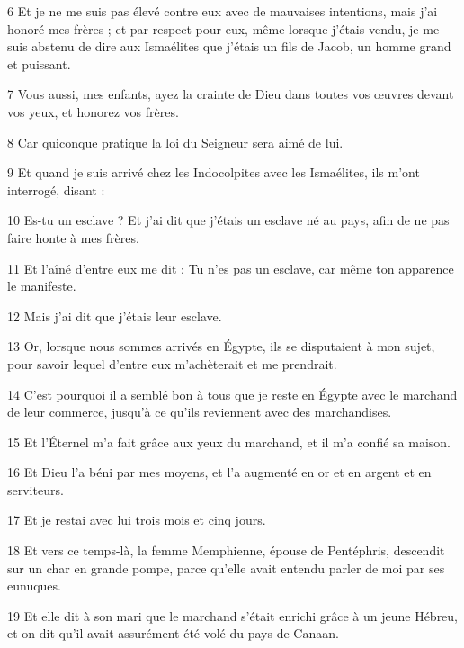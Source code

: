 \par 6 Et je ne me suis pas élevé contre eux avec de mauvaises intentions, mais j'ai honoré mes frères ; et par respect pour eux, même lorsque j'étais vendu, je me suis abstenu de dire aux Ismaélites que j'étais un fils de Jacob, un homme grand et puissant.

\par 7 Vous aussi, mes enfants, ayez la crainte de Dieu dans toutes vos œuvres devant vos yeux, et honorez vos frères.

\par 8 Car quiconque pratique la loi du Seigneur sera aimé de lui.

\par 9 Et quand je suis arrivé chez les Indocolpites avec les Ismaélites, ils m'ont interrogé, disant :

\par 10 Es-tu un esclave ? Et j'ai dit que j'étais un esclave né au pays, afin de ne pas faire honte à mes frères.

\par 11 Et l'aîné d'entre eux me dit : Tu n'es pas un esclave, car même ton apparence le manifeste.

\par 12 Mais j'ai dit que j'étais leur esclave.

\par 13 Or, lorsque nous sommes arrivés en Égypte, ils se disputaient à mon sujet, pour savoir lequel d'entre eux m'achèterait et me prendrait.

\par 14 C'est pourquoi il a semblé bon à tous que je reste en Égypte avec le marchand de leur commerce, jusqu'à ce qu'ils reviennent avec des marchandises.

\par 15 Et l'Éternel m'a fait grâce aux yeux du marchand, et il m'a confié sa maison.

\par 16 Et Dieu l'a béni par mes moyens, et l'a augmenté en or et en argent et en serviteurs.

\par 17 Et je restai avec lui trois mois et cinq jours.

\par 18 Et vers ce temps-là, la femme Memphienne, épouse de Pentéphris, descendit sur un char en grande pompe, parce qu'elle avait entendu parler de moi par ses eunuques.

\par 19 Et elle dit à son mari que le marchand s'était enrichi grâce à un jeune Hébreu, et on dit qu'il avait assurément été volé du pays de Canaan.

